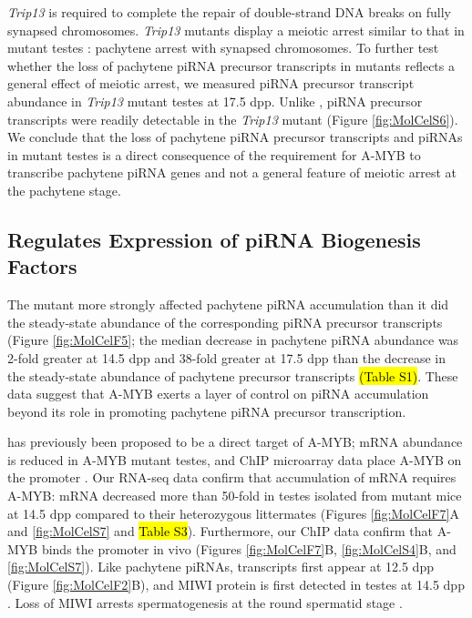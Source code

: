     \textit{Trip13} is required to complete the repair of double-strand DNA breaks on fully synapsed chromosomes. \textit{Trip13} mutants display a meiotic arrest similar to that in \amyb{} mutant testes \citep{Li2007}: pachytene arrest with synapsed chromosomes. To further test whether the loss of pachytene piRNA precursor transcripts in \amyb{} mutants reflects a general effect of meiotic arrest, we measured piRNA precursor transcript abundance in \textit{Trip13} mutant testes at 17.5 dpp. Unlike \amyb{}, piRNA precursor transcripts were readily detectable in the \textit{Trip13} mutant (Figure \ref{fig:MolCelS6}). We conclude that the loss of pachytene piRNA precursor transcripts and piRNAs in \amyb{} mutant testes is a direct consequence of the requirement for A-MYB to transcribe pachytene piRNA genes and not a general feature of meiotic arrest at the pachytene stage.

  \subsection{\amyb{} Regulates Expression of piRNA Biogenesis Factors}

    The \amyb{} mutant more strongly affected pachytene piRNA accumulation than it did the steady-state abundance of the corresponding piRNA precursor transcripts (Figure \ref{fig:MolCelF5}; the median decrease in pachytene piRNA abundance was 2-fold greater at 14.5 dpp and 38-fold greater at 17.5 dpp than the decrease in the steady-state abundance of pachytene precursor transcripts \hl{(Table S1)}. These data suggest that A-MYB exerts a layer of control on piRNA accumulation beyond its role in promoting pachytene piRNA precursor transcription.

    \miwi{} has previously been proposed to be a direct target of A-MYB; \miwi{} mRNA abundance is reduced in A-MYB mutant testes, and ChIP microarray data place A-MYB on the \miwi{} promoter \citep{Bolcun-Filas2011}. Our RNA-seq data confirm that accumulation of \miwi{} mRNA requires A-MYB: \miwi{} mRNA decreased more than 50-fold in testes isolated from \amyb{} mutant mice at 14.5 dpp compared to their heterozygous littermates (Figures \ref{fig:MolCelF7}A and \ref{fig:MolCelS7} and \hl{Table S3}). Furthermore, our ChIP data confirm that A-MYB binds the \miwi{} promoter in vivo (Figures \ref{fig:MolCelF7}B, \ref{fig:MolCelS4}B, and \ref{fig:MolCelS7}). Like pachytene piRNAs, \miwi{} transcripts first appear at 12.5 dpp (Figure \ref{fig:MolCelF2}B), and MIWI protein is first detected in testes at 14.5 dpp \citep{Deng2002c}. Loss of MIWI arrests spermatogenesis at the round spermatid stage \citep{Deng2002c}.

